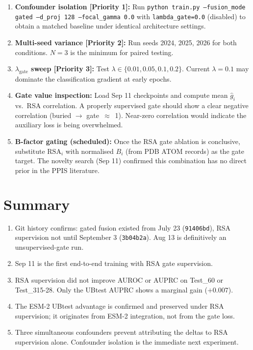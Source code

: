 \documentclass[10pt, a4paper]{article}
\newcommand{\code}[1]{\texttt{\small #1}}
\begin{document}
\begin{enumerate}[leftmargin=*]
    \item \textbf{Confounder isolation [Priority 1]:}
          Run \code{python train.py --fusion\_mode gated --d\_proj 128 --focal\_gamma 0.0}
          with \code{lambda\_gate=0.0} (disabled) to obtain a matched baseline
          under identical architecture settings.

    \item \textbf{Multi-seed variance [Priority 2]:}
          Run seeds 2024, 2025, 2026 for both conditions.
          $N=3$ is the minimum for paired testing.

    \item \textbf{$\lambda_\text{gate}$ sweep [Priority 3]:}
          Test $\lambda \in \{0.01, 0.05, 0.1, 0.2\}$.
          Current $\lambda=0.1$ may dominate the classification gradient
          at early epochs.

    \item \textbf{Gate value inspection:}
          Load Sep 11 checkpoints and compute mean $\hat{g}_i$ vs.\ RSA
          correlation.  A properly supervised gate should show a clear
          negative correlation (buried $\to$ gate~$\approx$~1).
          Near-zero correlation would indicate the auxiliary loss is
          being overwhelmed.

    \item \textbf{B-factor gating (scheduled):}
          Once the RSA gate ablation is conclusive, substitute
          $\text{RSA}_i$ with normalised $B_i$ (from PDB ATOM records)
          as the gate target.  The novelty search (Sep 11) confirmed
          this combination has no direct prior in the PPIS literature.
\end{enumerate}

\section*{Summary}

\begin{enumerate}[leftmargin=*]
    \item Git history confirms: gated fusion existed from July 23
          (\texttt{91406bd}), RSA supervision not until September 3
          (\texttt{3b04b2a}).  Aug 13 is definitively an unsupervised-gate run.
    \item Sep 11 is the first end-to-end training with RSA gate supervision.
    \item RSA supervision did not improve AUROC or AUPRC on Test\_60 or
          Test\_315-28.  Only the UBtest AUPRC shows a marginal gain ($+0.007$).
    \item The ESM-2 UBtest advantage is confirmed and preserved under RSA
          supervision; it originates from ESM-2 integration, not from the gate loss.
    \item Three simultaneous confounders prevent attributing the deltas
          to RSA supervision alone.  Confounder isolation is the immediate
          next experiment.
\end{enumerate}
\end{document}
